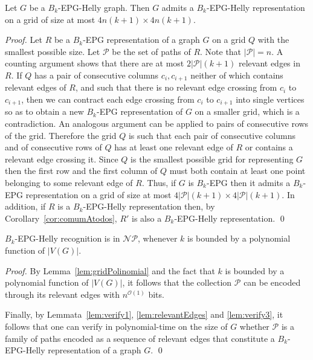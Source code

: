 \documentclass[runningheads]{llncs}
\begin{document}
\begin{lemma}\label{lem:gridPolinomial}
Let $G$ be a $B_k$-EPG-Helly graph. Then $G$ admits a $B_k$-EPG-Helly representation on a grid of size at most $4n(k+1) \times 4n(k+1)$.
\end{lemma}
\begin{proof}
Let $R$ be a $B_k$-EPG representation of a graph $G$ on a grid $Q$ with the smallest possible size.
Let $\mathcal{P}$ be the set of paths of $R$. Note that $|\mathcal{P}|=n$.
A counting argument shows that there are at most $2|\mathcal{P}|(k+1)$ relevant edges in $R$. 
 If $Q$ has a pair of consecutive columns $c_i,c_{i+1}$ neither of which contains relevant edges of $R$, and such that there is no relevant edge crossing from $c_i$ to $c_{i+1}$, then we can contract each edge crossing from $c_i$ to $c_{i+1}$ into single vertices so as to obtain a new  $B_k$-EPG representation of $G$ on a smaller grid, which is a contradiction. An analogous argument can be applied to pairs of consecutive rows of the grid.
 Therefore the grid $Q$ is such that each pair of consecutive columns and of consecutive rows of $Q$  has at least one relevant edge of $R$ or contains a relevant edge crossing it.  
  Since $Q$ is the smallest possible grid for representing $G$ then the first row and the first column of $Q$ must both contain at least one point belonging to some relevant edge of $R$. 
Thus, if $G$ is $B_k$-EPG then it admits a $B_k$-EPG representation on a grid of size at most $4|\mathcal{P}|(k+1) \times 4|\mathcal{P}|(k+1)$.
In addition, if $R$ is a $B_k$-EPG-Helly representation then, by Corollary~\ref{cor:comumAtodos},  $R'$ is also a  $B_k$-EPG-Helly representation.
\qed
\end{proof}

\begin{theorem}\label{teo:nppertinencia}
{\sc $B_k$-EPG-Helly recognition} is in $\mathcal{NP}$, whenever $k$ is bounded by a polynomial function of $|V(G)|$.
\end{theorem}
\begin{proof}
By Lemma~\ref{lem:gridPolinomial} and the fact that $k$ is bounded by a polynomial function of $|V(G)|$, it follows that the collection $\mathcal{P}$ can be encoded through its relevant edges with $n^{\mathcal{O}(1)}$ bits.

Finally, by Lemmata~\ref{lem:verify1}, \ref{lem:relevantEdges} and \ref{lem:verify3}, it follows that one can verify in polynomial-time on the size of $G$ whether $\mathcal{P}$ is a family of paths encoded as a sequence of relevant edges that constitute a $B_k$-EPG-Helly representation of a graph $G$.
\qed
\end{proof}
\end{document}
